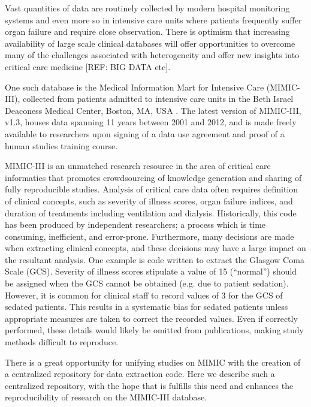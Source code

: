 \documentclass{elsart}
\begin{document}
Vast quantities of data are routinely collected by modern hospital monitoring systems and even more so in intensive care units where patients frequently suffer organ failure and require close observation. There is optimism that increasing availability of large scale clinical databases will offer opportunities to overcome many of the challenges associated with heterogeneity and offer new insights into critical care medicine [REF: BIG DATA etc]. 

One such database is the Medical Information Mart for Intensive Care (MIMIC-III), collected from patients admitted to intensive care units in the Beth Israel Deaconess Medical Center, Boston, MA, USA \cite{mimiciii}. The latest version of MIMIC-III, v1.3, houses data spanning 11 years between 2001 and 2012, and is made freely available to researchers upon signing of a data use agreement and proof of a human studies training course. 

MIMIC-III is an unmatched research resource in the area of critical care informatics that promotes crowdsourcing of knowledge generation and sharing of fully reproducible studies.
Analysis of critical care data often requires definition of clinical concepts, such as severity of illness scores, organ failure indices, and duration of treatments including ventilation and dialysis.
Historically, this code has been produced by independent researchers; a process which is time consuming, inefficient, and error-prone.
Furthermore, many decisions are made when extracting clinical concepts, and these decisions may have a large impact on the resultant analysis. One example is code written to extract the Glasgow Coma Scale (GCS). Severity of illness scores stipulate a value of 15 (``normal'') should be assigned when the GCS cannot be obtained (e.g. due to patient sedation). However, it is common for clinical staff to record values of 3 for the GCS of sedated patients. This results in a systematic bias for sedated patients unless appropriate measures are taken to correct the recorded values. Even if correctly performed, these details would likely be omitted from publications, making study methods difficult to reproduce.

There is a great opportunity for unifying studies on MIMIC with the creation of a centralized repository for data extraction code. Here we describe such a centralized repository, with the hope that is fulfills this need and enhances the reproducibility of research on the MIMIC-III database.
\end{document}
